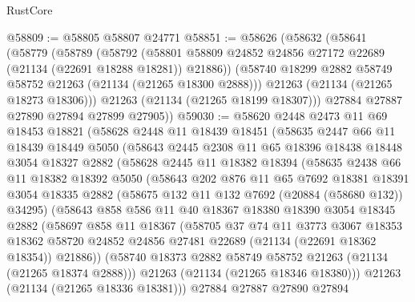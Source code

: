 \begin{lexlean}{RustCore}
\begin{coremodule}
@58809 := @58805 @58807 @24771
@58851 := @58626
    (@58632
      (@58641
        (@58779
          (@58789
            (@58792
              (@58801 @58809 @24852 @24856 @27172 @22689 (@21134 (@22691 @18288 @18281)) @21886))
            (@58740 @18299 @2882 @58749 @58752 @21263 (@21134 (@21265 @18300 @2888)))
            @21263
            (@21134 (@21265 @18273 @18306)))
          @21263
          (@21134 (@21265 @18199 @18307)))
        @27884
        @27887
        @27890
        @27894
        @27899
        @27905))
@59030 := @58620
    @2448
    @2473
    @11
    @69
    @18453
    @18821
    (@58628
      @2448
      @11
      @18439
      @18451
      (@58635
        @2447
        @66
        @11
        @18439
        @18449
        @5050
        (@58643
          @2445
          @2308
          @11
          @65
          @18396
          @18438
          @18448
          @3054
          @18327
          @2882
          (@58628
            @2445
            @11
            @18382
            @18394
            (@58635
              @2438
              @66
              @11
              @18382
              @18392
              @5050
              (@58643
                @202
                @876
                @11
                @65
                @7692
                @18381
                @18391
                @3054
                @18335
                @2882
                (@58675 @132 @11 @132 @7692 (@20884 (@58680 @132)) @34295)
                (@58643
                  @858
                  @586
                  @11
                  @40
                  @18367
                  @18380
                  @18390
                  @3054
                  @18345
                  @2882
                  (@58697
                    @858
                    @11
                    @18367
                    (@58705
                      @37
                      @74
                      @11
                      @3773
                      @3067
                      @18353
                      @18362
                      @58720
                      @24852
                      @24856
                      @27481
                      @22689
                      (@21134 (@22691 @18362 @18354))
                      @21886))
                  (@58740 @18373 @2882 @58749 @58752 @21263 (@21134 (@21265 @18374 @2888)))
                  @21263
                  (@21134 (@21265 @18346 @18380)))
                @21263
                (@21134 (@21265 @18336 @18381)))
              @27884
              @27887
              @27890
              @27894

\end{coremodule}
\end{lexlean}
